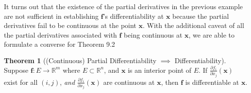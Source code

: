 \documentclass{article}
\newcommand{\R}{\mathbb{R}}
\newcommand{\x}{\mathbf{x}}
\newcommand{\f}{\mathbf{f}}
\theoremstyle{definition}
\newtheorem{theorem}{Theorem}[section]
\begin{document}
	It turns out that the existence of the partial derivatives in the previous example are not sufficient in establishing $ \f $'s differentiability at $ \x $ because the partial derivatives fail to be continuous at the point $ \x $. With the additional caveat of all the partial derivatives associated with $ \f $ being continuous at $ \x $, we are able to formulate a converse for Theorem 9.2
	\begin{theorem}[(Continuous) Partial Differentiability $\implies$ Differentiability]
		Suppose $ \f:E\to\R^m $ where $ E\subset \R^n $, and $ \mathbf x $ is an interior point of $ E $. If $ \frac{\partial f_i}{\partial x_j}(\x) $ exist for all $ (i,j) $, \textit{and} $ \frac{\partial f_i}{\partial x_j}(\x) $ are continuous at $ \x $, then $ \f $ is differentiable at $ \x $.  
		
	\end{theorem}
\end{document}
